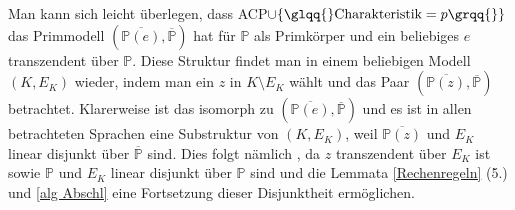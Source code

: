     \newpage
    \begin{remark}
    	Man kann sich leicht überlegen, dass ACP$\cup\{\glqq{}\text{Charakteristik}=p\grqq{}\}$ das Primmodell $(\overline{\mathbb{P}(e)},\overline{\mathbb{P}})$ hat für $\mathbb{P}$ als Primkörper und ein beliebiges $e$ transzendent über $\mathbb{P}$. Diese Struktur findet man in einem beliebigen Modell $(K,E_K)$ wieder, indem man ein $z$ in $K\setminus E_K$ wählt und das Paar $(\overline{\mathbb{P}(z)},\overline{\mathbb{P}})$ betrachtet. Klarerweise ist das isomorph zu $(\overline{\mathbb{P}(e)},\overline{\mathbb{P}})$ und es ist in allen betrachteten Sprachen eine Substruktur von $(K,E_K)$, weil $\overline{\mathbb{P}(z)}$ und $E_K$ linear disjunkt über $\overline{\mathbb{P}}$ sind. Dies folgt nämlich , da $z$ transzendent über $E_K$ ist sowie $\mathbb{P}$ und $E_K$ linear disjunkt über $\mathbb{P}$ sind und die Lemmata \ref{Rechenregeln} (5.) und \ref{alg Abschl} eine Fortsetzung dieser Disjunktheit ermöglichen.
    \end{remark}
    
